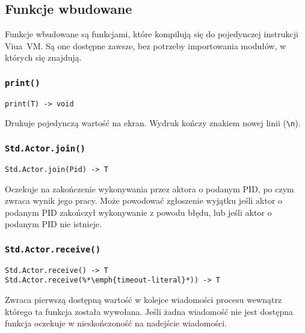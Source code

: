 \subsection{Funkcje wbudowane}
\label{stdlib_builtin_fns}

Funkcje wbudowane są funkcjami, które kompilują się do pojedynczej instrukcji
Viua~VM. Są one dostępne zawsze, bez potrzeby importowania modułów, w których
się znajdują.

\subsubsection{\texttt{print()}}
\label{stdlib_builtin_fns_print}

\begin{small}
\begin{lstlisting}
print(T) -> void
\end{lstlisting}
\end{small}

Drukuje pojedynczą wartość na ekran. Wydruk kończy znakiem nowej linii
(\texttt{\textbackslash{}n}).

\subsubsection{\texttt{Std.Actor.join()}}
\label{Std_Actor_join}

\begin{small}
\begin{lstlisting}
Std.Actor.join(Pid) -> T
\end{lstlisting}
\end{small}

Oczekuje na zakończenie wykonywania przez aktora o podanym PID, po czym zwraca
wynik jego pracy. Może powodować zgłoszenie wyjątku jeśli aktor o podanym PID
zakończył wykonywanie z powodu błędu, lub jeśli aktor o podanym PID nie
istnieje.

\subsubsection{\texttt{Std.Actor.receive()}}

\begin{small}
\begin{lstlisting}
Std.Actor.receive() -> T
Std.Actor.receive(%*\emph{timeout-literal}*)) -> T
\end{lstlisting}
\end{small}

Zwraca pierwszą dostępną wartość w kolejce wiadomości procesu wewnątrz którego
ta funkcja została wywołana. Jeśli żadna wiadomość nie jest dostępna funkcja
oczekuje w nieskończoność na nadejście wiadomości.

